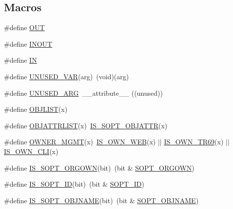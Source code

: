 \subsection*{Macros}
\begin{DoxyCompactItemize}
\item 
\#define \hyperlink{group__LIBHELP_gaec78e7a9e90a406a56f859ee456e8eae}{O\-U\-T}
\item 
\#define \hyperlink{group__LIBHELP_ga62766f3ea8784d1db62df989f8f33d2d}{I\-N\-O\-U\-T}
\item 
\#define \hyperlink{group__LIBHELP_gac2bbd6d630a06a980d9a92ddb9a49928}{I\-N}
\item 
\#define \hyperlink{group__LIBHELP_ga9b6231674e83b660e4d79f8c8fe91dd1}{U\-N\-U\-S\-E\-D\-\_\-\-V\-A\-R}(arg)~(void)(arg)
\item 
\#define \hyperlink{group__LIBHELP_ga21ef1846034259a6ce19cfa0a7983a0a}{U\-N\-U\-S\-E\-D\-\_\-\-A\-R\-G}~\-\_\-\-\_\-attribute\-\_\-\-\_\- ((unused))
\item 
\#define \hyperlink{group__LIBHELP_ga62f1164f5252ae6639d85d5dea956f7d}{O\-B\-J\-L\-I\-S\-T}(x)
\item 
\#define \hyperlink{group__LIBHELP_ga709d9444754a18c2483a4ee1a3db8b2d}{O\-B\-J\-A\-T\-T\-R\-L\-I\-S\-T}(x)~\hyperlink{group__LIBHELP_ga11f6b708dad9417466bd2bfab197af82}{I\-S\-\_\-\-S\-O\-P\-T\-\_\-\-O\-B\-J\-A\-T\-T\-R}(x)
\item 
\#define \hyperlink{group__LIBHELP_ga47bd262145705428c9123dc1adcce691}{O\-W\-N\-E\-R\-\_\-\-M\-G\-M\-T}(x)~\hyperlink{group__LIBHELP_ga1fc700d6ed6c0212ca1f376c31d52e7b}{I\-S\-\_\-\-O\-W\-N\-\_\-\-W\-E\-B}(x) $\vert$$\vert$  \hyperlink{group__LIBHELP_ga15e8b7e7c3992695f60e90ec7f5cb0da}{I\-S\-\_\-\-O\-W\-N\-\_\-\-T\-R69}(x) $\vert$$\vert$ \hyperlink{group__LIBHELP_gab08c7a3f1f53bb297b8898c362247c5c}{I\-S\-\_\-\-O\-W\-N\-\_\-\-C\-L\-I}(x)
\item 
\#define \hyperlink{group__LIBHELP_gabc5880b36bb8129ff37591ca058537af}{I\-S\-\_\-\-S\-O\-P\-T\-\_\-\-O\-R\-G\-O\-W\-N}(bit)~(bit \& \hyperlink{group__LIBHELP_gga26a2d765c9669d7cf62818f31a306f76a611b573ef4cad192232654b47c4e1ea0}{S\-O\-P\-T\-\_\-\-O\-R\-G\-O\-W\-N})
\item 
\#define \hyperlink{group__LIBHELP_ga12be59195dfbbad949d91d77335670f7}{I\-S\-\_\-\-S\-O\-P\-T\-\_\-\-I\-D}(bit)~(bit \& \hyperlink{group__LIBHELP_gga26a2d765c9669d7cf62818f31a306f76a86ca54869a37d6b2ee9f1ef03f18d7bd}{S\-O\-P\-T\-\_\-\-I\-D})
\item 
\#define \hyperlink{group__LIBHELP_ga9fc2a89a60f05f4a29597359e224fcba}{I\-S\-\_\-\-S\-O\-P\-T\-\_\-\-O\-B\-J\-N\-A\-M\-E}(bit)~(bit \& \hyperlink{group__LIBHELP_gga26a2d765c9669d7cf62818f31a306f76a590689005d14f4443e685b735a0fb598}{S\-O\-P\-T\-\_\-\-O\-B\-J\-N\-A\-M\-E})

\end{DoxyCompactItemize}
